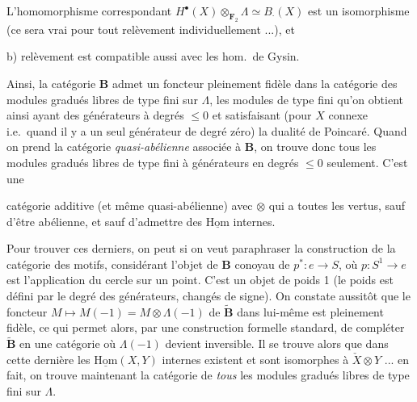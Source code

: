 \documentclass[11pt,a4paper]{article}
\begin{document}
 L'homomorphisme correspondant $H^{\bullet}(X)
\otimes_{\mathbf{F}_{2}} \Lambda \simeq B_{\cdot}(X)$ est un isomorphisme (ce
sera vrai pour tout relèvement individuellement ...), et

b) \add{[}   relèvement est compatible aussi avec les hom.\ de Gysin.

Ainsi, la catégorie $\mathbf{B}$ admet un foncteur pleinement fidèle dans la
catégorie des modules gradués libres de type fini sur $\Lambda$, les modules de
type fini qu'on obtient ainsi ayant des générateurs à degrés $\leq 0$ et
satisfaisant (pour $X$ connexe i.e.\ quand il y a un seul générateur de degré
zéro) la dualité de Poincaré. Quand on prend la catégorie \emph{quasi-abélienne}
 associée à $\mathbf{B}$, on trouve donc tous les modules gradués libres de type
fini à générateurs en degrés $\leq 0$ seulement. C'est une



catégorie additive (et même quasi-abélienne) avec $\otimes$ qui a toutes les
vertus, sauf d'être abélienne, et sauf d'admettre des
$\underline{\mathrm{Hom}}$ internes.


Pour trouver ces derniers, on peut si on veut paraphraser la construction de
la catégorie des motifs,  considérant l'objet  de
$\mathbf{B}$ conoyau de $p^{*} : e \to S$, où $p : S^{1} \to e$ est
l'application du cercle sur un point. C'est un objet de poids 1 (le poids est
défini par le degré des générateurs, changés de signe). On constate aussitôt
que le foncteur $M \mapsto M(-1) = M \otimes \Lambda(-1)$ de
$\widetilde{\mathbf{B}}$ dans lui-même est pleinement fidèle, ce qui permet
alors, par une construction formelle standard, de compléter
$\widetilde{\mathbf{B}}$ en une catégorie où $\Lambda(-1)$ devient inversible.
Il se trouve alors que dans cette dernière les $\underline{\mathrm{Hom}}(X, Y)$
internes existent et sont isomorphes à $\check{X} \otimes Y$ ... en fait,
on trouve maintenant la catégorie de \emph{tous} les modules gradués libres de
type fini sur $\Lambda$.
\end{document}
